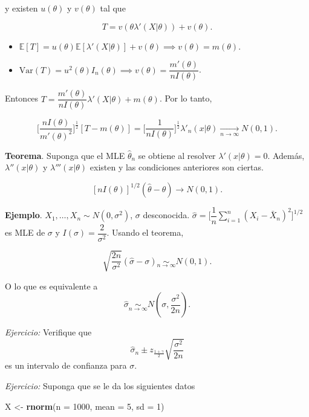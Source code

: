 \documentclass[
  12pt,
]{book}
\newenvironment{Shaded}{\begin{snugshade}}{\end{snugshade}}
\newcommand{\DataTypeTok}[1]{\textcolor[rgb]{0.13,0.29,0.53}{#1}}
\newcommand{\DecValTok}[1]{\textcolor[rgb]{0.00,0.00,0.81}{#1}}
\newcommand{\KeywordTok}[1]{\textcolor[rgb]{0.13,0.29,0.53}{\textbf{#1}}}
\newcommand{\NormalTok}[1]{#1}
\newcommand{\StringTok}[1]{\textcolor[rgb]{0.31,0.60,0.02}{#1}}
\begin{document}
y existen \(u(\theta)\) y \(v(\theta)\) tal que

\[T = v(\theta \lambda'(X|\theta)) + v(\theta).\]

\begin{itemize}
\item
  \(\mathbb E [T]= u(\theta)\mathbb E[\lambda'(X|\theta)] + v(\theta) \implies v(\theta) = m(\theta)\).
\item
  \(\text{Var}(T) = u^2(\theta)I_n(\theta) \implies v(\theta) = \dfrac{m'(\theta)}{nI(\theta)}\).
\end{itemize}

Entonces \(T = \dfrac{m'(\theta)}{nI(\theta)}\lambda'(X|\theta) + m(\theta)\). Por lo tanto,

\[\bigg[\dfrac{nI(\theta)}{m'(\theta)^2}\bigg]^{\frac 12}[T-m(\theta)] = \bigg[\dfrac 1 {nI(\theta)}\bigg]^{\frac 12}\lambda'_n(x|\theta) \xrightarrow[n\to\infty]{} N(0,1).\]

\textbf{Teorema}. Suponga que el MLE \(\hat \theta_n\) se obtiene al resolver \(\lambda'(x|\theta) = 0\). Además, \(\lambda''(x|\theta)\) y \(\lambda'''(x|\theta)\) existen y las condiciones anteriores son ciertas.

\[[nI(\theta)]^{1/2}(\hat\theta-\theta) \to N(0,1).\]

\textbf{Ejemplo}. \(X_1,\dots, X_n \sim N(0,\sigma^2)\), \(\sigma\) desconocida. \(\hat\sigma = \bigg[\dfrac 1n \sum_{i=1}^{n}\left(X_{i}-\bar{X}_{n}\right)^{2}\bigg]^{1/2}\) es MLE de \(\sigma\) y \(I(\sigma) = \dfrac 2{\sigma^2}\).
Usando el teorema,

\[\sqrt{\dfrac{2n}{\sigma^2}} (\hat{\sigma} - \sigma) \underset{n\to\infty}{\sim} N\left(0,1\right).\]

O lo que es equivalente a \[\hat{\sigma} \underset{n\to\infty}{\sim}
N\left(\sigma,\dfrac{\sigma^2}{2n}\right).\]

\emph{Ejercicio:} Verifique que
\[ \hat\sigma_n\pm z_{\frac{1+\gamma}{2}}\sqrt{\dfrac{\sigma^2}{2n}}\] es un
intervalo de confianza para \(\sigma\).

\emph{Ejercicio:} Suponga que se le da los siguientes datos

\begin{Shaded}
\begin{Highlighting}[]
\NormalTok{X \textless{}{-}}\StringTok{ }\KeywordTok{rnorm}\NormalTok{(}\DataTypeTok{n =} \DecValTok{1000}\NormalTok{, }\DataTypeTok{mean =} \DecValTok{5}\NormalTok{, }\DataTypeTok{sd =} \DecValTok{1}\NormalTok{)}
\end{Highlighting}
\end{Shaded}
\end{document}
